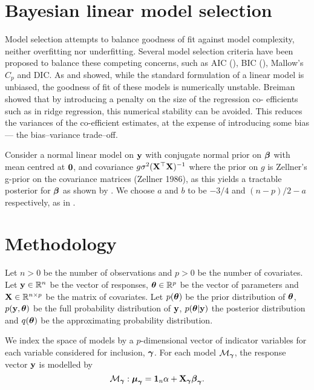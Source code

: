 \documentclass{amsart}[12pt]
\begin{document}
\section{Bayesian linear model selection}
\label{sec:model_selection}

Model selection attempts to balance goodness of fit against model complexity, neither overfitting nor
underfitting. Several model selection criteria have been proposed to balance these competing concerns, such as
AIC (\cite{DeLeeuw1992}), BIC (\cite{Schwarz1978}), Mallow's $C_p$ and DIC. As \cite{Breiman1996} and
\cite{Efron2013} showed, while  the standard formulation of a linear model is unbiased, the goodness of fit of
these models is numerically  unstable. Breiman showed that by introducing a penalty on the size of the
regression co- efficients such as  in ridge regression, this numerical stability can be avoided. This reduces
the variances of the co-efficient estimates, at the expense of introducing some bias --- the bias--variance
trade--off.

Consider a normal linear model on ${\bf y}$ with conjugate normal prior on ${\boldsymbol \beta}$ with mean centred at ${\bf 0}$,
and covariance $g \sigma^2 ({\bf X}^\top {\bf X})^{-1}$ where the prior on $g$ is Zellner's g-prior on the covariance
matrices (Zellner 1986), as this yields a tractable posterior for ${\boldsymbol \beta}$ as shown by \cite{Liang2008}. We choose $a$  and $b$ to be $-3/4$ and $(n - p)/2 - a$ respectively, as in \cite{Maruyama2011}.

\section{Methodology}
\label{sec:methodology}

Let $n > 0$ be the number of observations and $p > 0$ be the number of covariates. Let ${\bf y} \in {\mathbb{R}}^n$ be the
vector of responses, ${\boldsymbol \theta} \in {\mathbb{R}}^p$ be the vector of parameters and ${\bf X} \in {\mathbb{R}}^{n \times p}$ be the
matrix of covariates. Let $p({\boldsymbol \theta})$ be the prior distribution of ${\boldsymbol \theta}$, $p({\bf y}, {\boldsymbol \theta})$ be the full
probability distribution of ${\bf y}$, $p({\boldsymbol \theta} | {\bf y})$ the posterior distribution and $q({\boldsymbol \theta})$ be the
approximating probability distribution.

We index the space of models by a $p$-dimensional vector of indicator variables for each variable considered 
for inclusion, ${\boldsymbol \gamma}$. For each model $\mathcal{M}_{\boldsymbol \gamma}$, the response vector ${\bf y}$ is modelled by
\begin{equation*}
\mathcal{M}_{\boldsymbol \gamma}: {\boldsymbol \mu}_{\boldsymbol \gamma} = {\bf 1}_n \alpha + {\bf X}_{\boldsymbol \gamma} {\boldsymbol \beta}_{\boldsymbol \gamma}.
\end{equation*}
\end{document}
